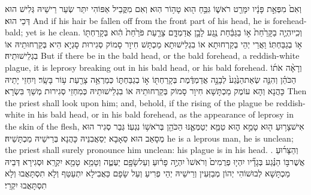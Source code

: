{וְאִם֙ מִפְּאַ֣ת פָּנָ֔יו יִמָּרֵ֖ט רֹאשׁ֑וֹ גִּבֵּ֥חַ ה֖וּא טָה֥וֹר הֽוּא׃}
{וְאִם מִקֳּבֵיל אַפּוֹהִי יִתַּר שְׂעַר רֵישֵׁיהּ גְּלִישׁ הוּא דְּכֵי הוּא׃}
{And if his hair be fallen off from the front part of his head, he is forehead-bald; yet is he clean.}{}
{וְכִֽי\maqqaf יִהְיֶ֤ה בַקָּרַ֙חַת֙ א֣וֹ בַגַּבַּ֔חַת נֶ֖גַע לָבָ֣ן אֲדַמְדָּ֑ם צָרַ֤עַת פֹּרַ֙חַת֙ הִ֔וא בְּקָרַחְתּ֖וֹ א֥וֹ בְגַבַּחְתּֽוֹ׃}
{וַאֲרֵי יְהֵי בְקַרְחוּתָא אוֹ בִגְלֵישׁוּתָא מַכְתָּשׁ חִיוָר סָמוֹק סְגִירוּת סָגְיָא הִיא בְּקַרְחוּתֵיהּ אוֹ בִגְלֵישׁוּתֵיהּ׃}
{But if there be in the bald head, or the bald forehead, a reddish-white plague, it is leprosy breaking out in his bald head, or his bald forehead.}{}
{וְרָאָ֨ה אֹת֜וֹ הַכֹּהֵ֗ן וְהִנֵּ֤ה שְׂאֵת\maqqaf הַנֶּ֙גַע֙ לְבָנָ֣ה אֲדַמְדֶּ֔מֶת בְּקָרַחְתּ֖וֹ א֣וֹ בְגַבַּחְתּ֑וֹ כְּמַרְאֵ֥ה צָרַ֖עַת ע֥וֹר בָּשָֽׂר׃}
{וְיִחְזֵי יָתֵיהּ כָּהֲנָא וְהָא עוֹמֶק מַכְתָּשָׁא חִיוָר סָמוֹק בְּקַרְחוּתֵיהּ אוֹ בִגְלֵישׁוּתֵיהּ כְּמִחְזֵי סְגִירוּת מְשַׁךְ בִּשְׂרָא׃}
{Then the priest shall look upon him; and, behold, if the rising of the plague be reddish-white in his bald head, or in his bald forehead, as the appearance of leprosy in the skin of the flesh,}{}
{אִישׁ\maqqaf צָר֥וּעַ ה֖וּא טָמֵ֣א ה֑וּא טַמֵּ֧א יְטַמְּאֶ֛נּוּ הַכֹּהֵ֖ן בְּרֹאשׁ֥וֹ נִגְעֽוֹ׃}
{גְּבַר סְגִיר הוּא מְסָאַב הוּא סַאָבָא יְסַאֲבִנֵּיהּ כָּהֲנָא בְּרֵישֵׁיהּ מַכְתָּשֵׁיהּ׃}
{he is a leprous man, he is unclean; the priest shall surely pronounce him unclean: his plague is in his head. .}{}
{וְהַצָּר֜וּעַ אֲשֶׁר\maqqaf בּ֣וֹ הַנֶּ֗גַע בְּגָדָ֞יו יִהְי֤וּ פְרֻמִים֙ וְרֹאשׁוֹ֙ יִהְיֶ֣ה פָר֔וּעַ וְעַל\maqqaf שָׂפָ֖ם יַעְטֶ֑ה וְטָמֵ֥א \pasek  טָמֵ֖א יִקְרָֽא׃}
{וּסְגִירָא דְּבֵיהּ מַכְתָּשָׁא לְבוּשׁוֹהִי יְהוֹן מְבַזְּעִין וְרֵישֵׁיהּ יְהֵי פְרִיעַ וְעַל שָׂפָם כַּאֲבִילָא יִתְעַטַּף וְלָא תִסְתָּאֲבוּ וְלָא תִסְתָּאֲבוּ יִקְרֵי׃}
